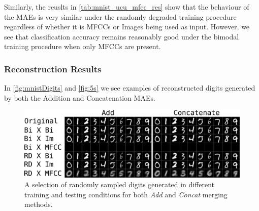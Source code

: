 Similarly, the reuslts in \autoref{tab:mnist_ucu_mfcc_res} show that the behaviour of the MAEs is very similar under the randomly degraded training procedure regardless of whether it is MFCCs or Images being used as input. However, we see that classification accuracy remains reasonably good under the bimodal training procedure when only MFCCs are present. 

\subsubsection{Reconstruction Results}

In \autoref{fig:mnistDigits} and \autoref{fig:5s} we see examples of reconstructed digits generated by both the Addition and Concatenation MAEs.
\begin{figure}
\begin{center}
	\includegraphics[width=\textwidth]{Figs/mnistSpoken/lbAll.png}
	\caption{A selection of randomly sampled digits generated in different training and testing conditions for both \textit{Add} and \textit{Concat} merging methods.}
	\label{fig:mnistDigits}
\end{center}
\end{figure}

